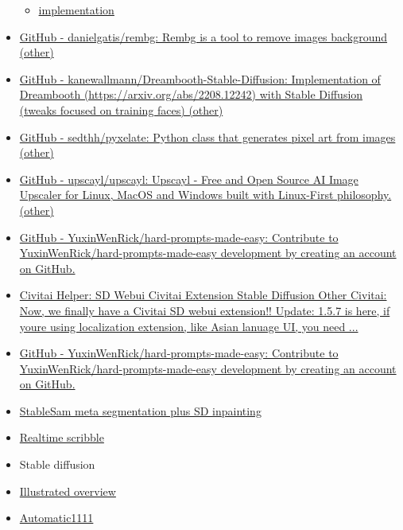 \begin{itemize}
\begin{itemize}
  \item
    \href{https://github.com/lucidrains/gigagan-pytorch}{implementation}
  \end{itemize}
\item
  \href{https://github.com/danielgatis/rembg}{GitHub -
  danielgatis/rembg: Rembg is a tool to remove images background
  (other)}
\item
  \href{https://github.com/kanewallmann/dreambooth-stable-diffusion}{GitHub
  - kanewallmann/Dreambooth-Stable-Diffusion: Implementation of
  Dreambooth (https://arxiv.org/abs/2208.12242) with Stable Diffusion
  (tweaks focused on training faces) (other)}
\item
  \href{https://github.com/sedthh/pyxelate}{GitHub - sedthh/pyxelate:
  Python class that generates pixel art from images (other)}
\item
  \href{https://github.com/upscayl/upscayl}{GitHub - upscayl/upscayl:  
  Upscayl - Free and Open Source AI Image Upscaler for Linux, MacOS and
  Windows built with Linux-First philosophy. (other)}
\item
  \href{https://github.com/YuxinWenRick/hard-prompts-made-easy}{GitHub -
  YuxinWenRick/hard-prompts-made-easy: Contribute to
  YuxinWenRick/hard-prompts-made-easy development by creating an account
  on GitHub.}
\item
  \href{https://civitai.com/models/16768/civitai-helper-sd-webui-civitai-extension}{Civitai
  Helper: SD Webui Civitai Extension \textbar{} Stable Diffusion Other
  \textbar{} Civitai: Now, we finally have a Civitai SD webui
  extension!! Update: 1.5.7 is here, if you\textquotesingle re using
  localization extension, like Asian lanuage UI, you need ...}
\item
  \href{https://github.com/YuxinWenRick/hard-prompts-made-easy}{GitHub -
  YuxinWenRick/hard-prompts-made-easy: Contribute to
  YuxinWenRick/hard-prompts-made-easy development by creating an account
  on GitHub.}
\item
  \href{https://twitter.com/abhi1thakur/status/1645669023726592007}{StableSam
  meta segmentation plus SD inpainting}
\item
  \href{https://github.com/houseofsecrets/SdPaint}{Realtime scribble}
\item
  Stable diffusion
\item
  \href{https://jalammar.github.io/illustrated-stable-diffusion/}{Illustrated
  overview}
\item
  \href{https://www.thosesixfaces.com/post/stable-diffusion-getting-started-windows}{Automatic1111
}
\end{itemize}
